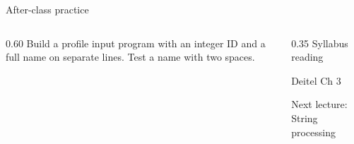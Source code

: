 \documentclass[10pt,aspectratio=169]{beamer}
\begin{document}
\begin{frame}[fragile,t]{After-class practice}
\begin{columns}[T,onlytextwidth]\begin{column}{0.60\textwidth}
Build a profile input program with an integer ID and a full name on separate lines. Test a name with two spaces.
\end{column}\begin{column}{0.35\textwidth}\small
Syllabus reading\par Deitel Ch 3

Next lecture: String processing
\end{column}\end{columns}
\end{frame}
\end{document}
